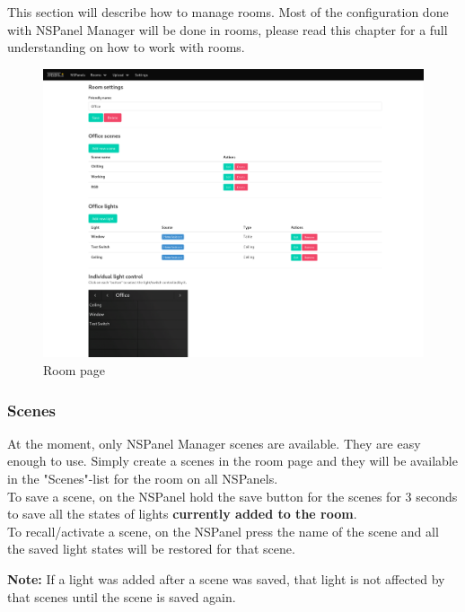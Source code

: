 \documentclass[10pt]{article}
\newcommand{\note}[1]{\begin{noteBox} \textbf{Note:} #1 \end{noteBox}}
\begin{document}
    This section will describe how to manage rooms. Most of the configuration done with NSPanel Manager will be done in rooms, please read this chapter for a full understanding on how to work with rooms.

    \begin{figure}[H]
    \centering
    \includegraphics[width=\textwidth,height=\textheight,keepaspectratio]{room_page.png}
    \caption{Room page}%
    \end{figure}
    \subsubsection{Scenes}
    At the moment, only NSPanel Manager scenes are available. They are easy enough to use. Simply create a scenes in the room page and they will be available in the "Scenes"-list for the room on all NSPanels.
    \\ To save a scene, on the NSPanel hold the save button for the scenes for 3 seconds to save all the states of lights \textbf{currently added to the room}.
    \\ To recall/activate a scene, on the NSPanel press the name of the scene and all the saved light states will be restored for that scene.
    \note{If a light was added after a scene was saved, that light is not affected by that scenes until the scene is saved again.}
\end{document}
